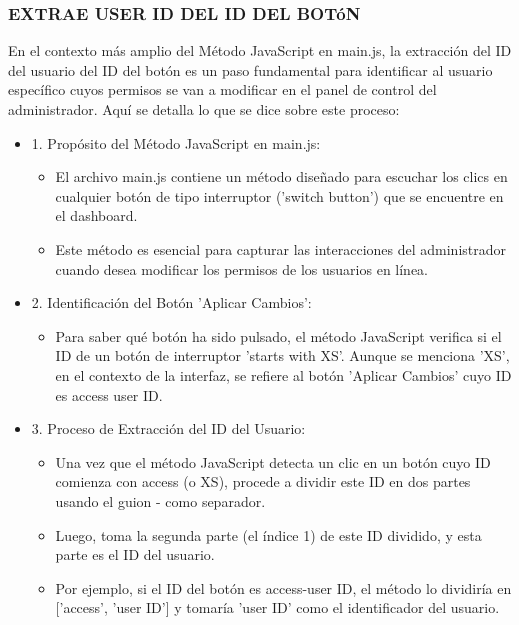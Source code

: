 \documentclass{report}
\begin{document}
\subsubsection{EXTRAE USER ID DEL ID DEL BOTóN}
En el contexto más amplio del Método JavaScript en main.js, la extracción del ID del usuario del ID del botón es un paso 
fundamental para identificar al usuario específico cuyos permisos se van a modificar en el panel de control del administrador.
Aquí se detalla lo que se dice sobre este proceso:
\begin{itemize}
    \item 1. Propósito del Método JavaScript en main.js:
        \begin{itemize}
            \item El archivo main.js contiene un método diseñado para escuchar los clics en cualquier botón de tipo interruptor ('switch button') que se encuentre en el dashboard.
            \item Este método es esencial para capturar las interacciones del administrador cuando desea modificar los permisos de los usuarios en línea.        
        \end{itemize}
    \item 2. Identificación del Botón 'Aplicar Cambios':
        \begin{itemize}
            \item Para saber qué botón ha sido pulsado, el método JavaScript verifica si el ID de un botón de interruptor 'starts with XS'. Aunque se menciona 'XS', en el contexto de la interfaz, se refiere al botón 'Aplicar Cambios' cuyo ID es access user ID.        
        \end{itemize}
    \item 3. Proceso de Extracción del ID del Usuario:
        \begin{itemize}
            \item Una vez que el método JavaScript detecta un clic en un botón cuyo ID comienza con access (o XS), procede a dividir este ID en dos partes usando el guion - como separador.
            \item Luego, toma la segunda parte (el índice 1) de este ID dividido, y esta parte es el ID del usuario.
            \item Por ejemplo, si el ID del botón es access-user ID, el método lo dividiría en ['access', 'user ID'] y tomaría 'user ID' como el identificador del usuario.
        \end{itemize}

\end{itemize}
\end{document}
